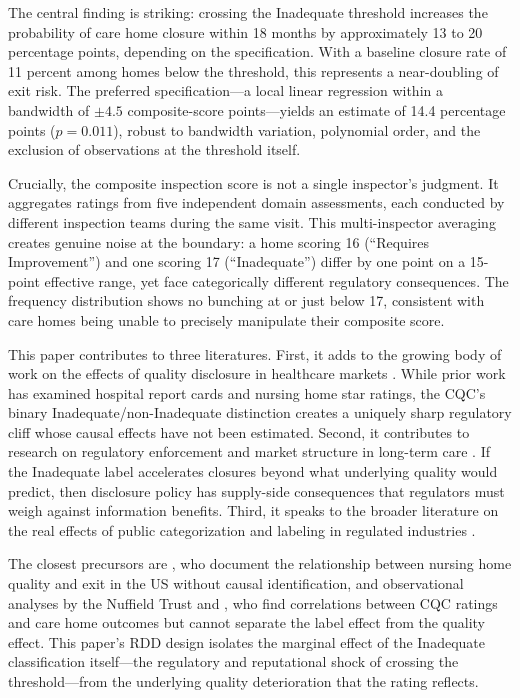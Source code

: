 \documentclass[12pt]{article}
\begin{document}
The central finding is striking: crossing the Inadequate threshold increases the probability of care home closure within 18 months by approximately 13 to 20 percentage points, depending on the specification. With a baseline closure rate of 11 percent among homes below the threshold, this represents a near-doubling of exit risk. The preferred specification---a local linear regression within a bandwidth of $\pm 4.5$ composite-score points---yields an estimate of 14.4 percentage points ($p = 0.011$), robust to bandwidth variation, polynomial order, and the exclusion of observations at the threshold itself.

Crucially, the composite inspection score is not a single inspector's judgment. It aggregates ratings from five independent domain assessments, each conducted by different inspection teams during the same visit. This multi-inspector averaging creates genuine noise at the boundary: a home scoring 16 (``Requires Improvement'') and one scoring 17 (``Inadequate'') differ by one point on a 15-point effective range, yet face categorically different regulatory consequences. The frequency distribution shows no bunching at or just below 17, consistent with care homes being unable to precisely manipulate their composite score.

This paper contributes to three literatures. First, it adds to the growing body of work on the effects of quality disclosure in healthcare markets \citep{dranove2003quality, werner2012effect, kolstad2013information, cutler2022designing}. While prior work has examined hospital report cards and nursing home star ratings, the CQC's binary Inadequate/non-Inadequate distinction creates a uniquely sharp regulatory cliff whose causal effects have not been estimated. Second, it contributes to research on regulatory enforcement and market structure in long-term care \citep{grabowski2008quality, harrington2000deficiencies, rahman2016effect}. If the Inadequate label accelerates closures beyond what underlying quality would predict, then disclosure policy has supply-side consequences that regulators must weigh against information benefits. Third, it speaks to the broader literature on the real effects of public categorization and labeling in regulated industries \citep{dafny2015more, jin2003quality, chatterji2010does}.

The closest precursors are \citet{grabowski2004recent}, who document the relationship between nursing home quality and exit in the US without causal identification, and observational analyses by the Nuffield Trust \citep{nuffield2022cqc} and \citet{dixon2020cqc}, who find correlations between CQC ratings and care home outcomes but cannot separate the label effect from the quality effect. This paper's RDD design isolates the marginal effect of the Inadequate classification itself---the regulatory and reputational shock of crossing the threshold---from the underlying quality deterioration that the rating reflects.
\end{document}
